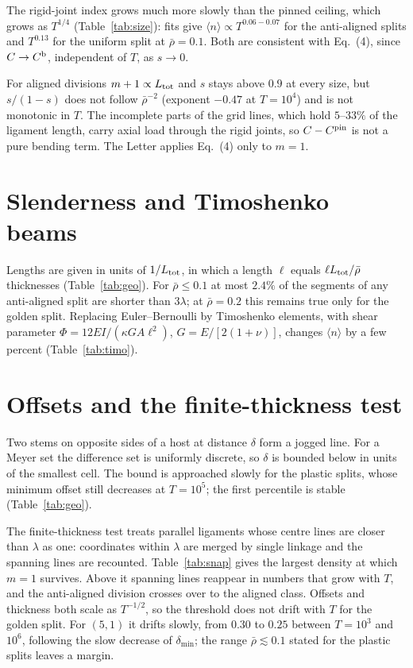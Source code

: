 \documentclass[aps,prl,onecolumn,superscriptaddress,amsmath,amssymb,floatfix]{revtex4-2}
\begin{document}
The rigid-joint index grows much more slowly than the pinned ceiling, which grows as
$T^{1/4}$ (Table~\ref{tab:size}): fits give $\langle n\rangle\propto T^{0.06-0.07}$ for the
anti-aligned splits and $T^{0.13}$ for the uniform split at $\bar\rho=0.1$. Both are consistent
with Eq.~(4), since $C\to C^{\rm b}$, independent of $T$, as $s\to0$.

For aligned divisions $m+1\propto L_{\rm tot}$ and $s$ stays above $0.9$ at every size, but
$s/(1-s)$ does not follow $\bar\rho^{-2}$ (exponent $-0.47$ at $T=10^{4}$) and is not monotonic
in $T$. The incomplete parts of the grid lines, which hold $5$--$33\%$ of the ligament length,
carry axial load through the rigid joints, so $C-C^{\rm pin}$ is not a pure bending term. The
Letter applies Eq.~(4) only to $m=1$.

\section{Slenderness and Timoshenko beams}

Lengths are given in units of $1/L_{\rm tot}$, in which a length $\ell$ equals $\ell
L_{\rm tot}/\bar\rho$ thicknesses (Table~\ref{tab:geo}). For $\bar\rho\le0.1$ at most $2.4\%$
of the segments of any anti-aligned split are shorter than $3\lambda$; at $\bar\rho=0.2$ this
remains true only for the golden split. Replacing Euler--Bernoulli by Timoshenko elements, with
shear parameter $\Phi=12EI/(\kappa GA\ell^{2})$, $G=E/[2(1+\nu)]$, changes $\langle n\rangle$
by a few percent (Table~\ref{tab:timo}).

\section{Offsets and the finite-thickness test}

Two stems on opposite sides of a host at distance $\delta$ form a jogged line. For a Meyer set
the difference set is uniformly discrete, so $\delta$ is bounded below in units of the
smallest cell. The bound is approached slowly for the plastic splits, whose minimum offset
still decreases at $T=10^{5}$; the first percentile is stable (Table~\ref{tab:geo}).

The finite-thickness test treats parallel ligaments whose centre lines are closer than
$\lambda$ as one: coordinates within $\lambda$ are merged by single linkage and the spanning
lines are recounted. Table~\ref{tab:snap} gives the largest density at which $m=1$ survives.
Above it spanning lines reappear in numbers that grow with $T$, and the anti-aligned division
crosses over to the aligned class. Offsets and thickness both scale as $T^{-1/2}$, so the
threshold does not drift with $T$ for the golden split. For $(5,1)$ it drifts slowly, from
$0.30$ to $0.25$ between $T=10^{3}$ and $10^{6}$, following the slow decrease of $\delta_{\min}$;
the range $\bar\rho\lesssim0.1$ stated for the plastic splits leaves a margin.
\end{document}
